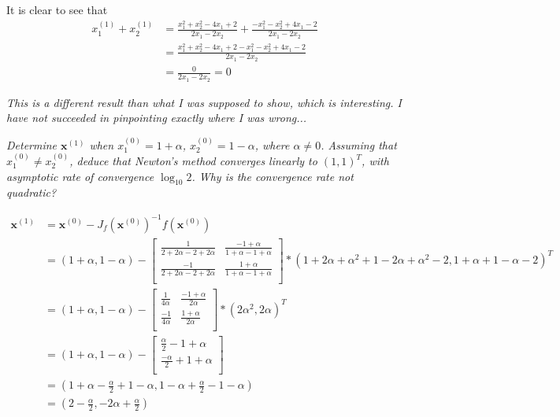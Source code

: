 It is clear to see that
\begin{align*}
    x_1^{(1)} + x_2^{(1)} &= \frac{x_1^2 + x_2^2 - 4x_1  + 2}{2x_1 - 2x_2} + \frac{-x_1^2 - x_2^2 + 4x_1  - 2}{2x_1 - 2x_2} \\
    &= \frac{x_1^2 + x_2^2 - 4x_1  + 2 - x_1^2 - x_2^2 + 4x_1  - 2}{2x_1 - 2x_2} \\
    &= \frac{0}{2x_1 - 2x_2} = 0
\end{align*}

\textit{This is a different result than what I was supposed to show, which is interesting. I have not succeeded in pinpointing exactly where I was wrong...}


\textit{Determine $\mathbf{x}^{(1)}$ when $x_1^{(0)} = 1 + \alpha$, $x_2^{(0)} = 1 - \alpha$, where $\alpha \ne 0$. Assuming that $x_1^{(0)} \ne x_2^{(0)}$, deduce that Newton's method converges linearly to $(1, 1)^T$, with asymptotic rate of convergence $\log_{10}2$. Why is the convergence rate not quadratic?}

\begin{align*}
    \mathbf{x}^{(1)} &= \mathbf{x}^{(0)} - J_f(\mathbf{x}^{(0)})^{-1} f(\mathbf{x}^{(0)}) \\
    &= (1 + \alpha, 1 - \alpha) - \begin{bmatrix}
        \frac{1}{2 + 2\alpha - 2 + 2\alpha} & \frac{-1 + \alpha}{1 + \alpha - 1 + \alpha} \\
        \frac{-1}{2 + 2\alpha - 2 + 2\alpha} & \frac{1 + \alpha}{1 + \alpha - 1 + \alpha} \\
    \end{bmatrix} * (1 + 2\alpha + \alpha^2 + 1 - 2\alpha + \alpha^2 - 2, 1 + \alpha + 1 - \alpha - 2)^T \\
    &= (1 + \alpha, 1 - \alpha) - \begin{bmatrix}
        \frac{1}{4\alpha} & \frac{-1 + \alpha}{2\alpha} \\
        \frac{-1}{4\alpha} & \frac{1 + \alpha}{2\alpha} \\
    \end{bmatrix} * (2\alpha^2, 2\alpha)^T \\
    &= (1 + \alpha, 1 - \alpha) - \begin{bmatrix}
        \frac{\alpha}{2} -1 + \alpha \\
        \frac{-\alpha}{2} + 1 + \alpha \\
    \end{bmatrix} \\
    &= (1 + \alpha - \frac{\alpha}{2} + 1 - \alpha, 1 - \alpha + \frac{\alpha}{2} - 1 - \alpha) \\
    &= (2 - \frac{\alpha}{2}, - 2\alpha + \frac{\alpha}{2}) \\
\end{align*}


